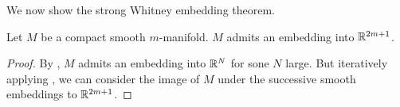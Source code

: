 We now show the strong Whitney embedding theorem. 
\begin{theorem}\label{thm: strong Whitney embedding}
    Let $M$ be a compact smooth $m$-manifold. $M$ admits an embedding into $\mathbb{R}^{2m+1}$. 
\end{theorem}
\begin{proof}
    By , $M$ admits an embedding into $\mathbb{R}^{N}$ for sone $N$ large. But iteratively applying , we can consider the image of $M$ under the successive smooth embeddings to $\mathbb{R}^{2m+1}$. 
\end{proof}